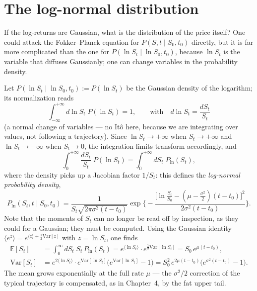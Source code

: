 \section{The log-normal distribution}\label{sec:log-normal}

If the log-returns are Gaussian, what is the distribution of the price itself?
One could attack the Fokker--Planck equation for $P(S,t \mid S_0,t_0)$ directly, but it is far more complicated than the one for $P(\ln S_t \mid \ln S_0, t_0)$, because $\ln S_t$ is the variable that diffuses Gaussianly; one can change variables in the probability density.

Let $P(\ln S_t \mid \ln S_0, t_0) := P(\ln S_t)$ be the Gaussian density of the logarithm; its normalization reads
\begin{equation}
\int_{-\infty}^{+\infty}\!d\ln S_t\; P(\ln S_t) = 1,
\qquad\text{with}\quad
d\ln S_t = \frac{dS_t}{S_t}
\end{equation}
(a normal change of variables --- no It\^o here, because we are integrating over values, not following a trajectory).
Since $\ln S_t \to +\infty$ when $S_t\to +\infty$ and $\ln S_t\to -\infty$ when $S_t\to 0$, the integration limits transform accordingly, and
\begin{equation}
\int_0^{+\infty}\!\frac{dS_t}{S_t}\; P(\ln S_t) = \int_0^{+\infty}\! dS_t\; P_{\ln}(S_t),
\end{equation}
where the density picks up a Jacobian factor $1/S_t$: this defines the \emph{log-normal probability density},
\begin{equation}\label{eq:log-normal}
P_{\ln}(S_t, t \mid S_0, t_0) = \frac{1}{S_t\sqrt{2\pi\sigma^2(t-t_0)}} \exp\!\biggl\{-\frac{\bigl[\ln\frac{S_t}{S_0} - (\mu-\frac{\sigma^2}{2})(t-t_0)\bigr]^2}{2\sigma^2(t-t_0)}\biggr\}.
\end{equation}
Note that the moments of $S_t$ can no longer be read off by inspection, as they could for a Gaussian; they must be computed.
Using the Gaussian identity $\langle e^z\rangle = e^{\langle z\rangle+\frac12\mathrm{Var}[z]}$ with $z=\ln S_t$, one finds
\begin{align}
\mathbb{E}[S_t] &= \int_0^{\infty}\!dS_t\; S_t\, P_{\ln}(S_t) = e^{\langle\ln S_t\rangle} \cdot e^{\frac{1}{2}\mathrm{Var}[\ln S_t]} = S_0\, e^{\mu(t-t_0)}, \label{eq:gbm-mean} \\[6pt]
\mathrm{Var}[S_t] &= e^{2\langle\ln S_t\rangle} \cdot e^{\mathrm{Var}[\ln S_t]}\bigl(e^{\mathrm{Var}[\ln S_t]}-1\bigr) = S_0^2\, e^{2\mu(t-t_0)}\bigl(e^{\sigma^2(t-t_0)}-1\bigr). \label{eq:gbm-var}
\end{align}
The mean grows exponentially at the full rate $\mu$ --- the $\sigma^2/2$ correction of the typical trajectory is compensated, as in Chapter~4, by the fat upper tail.

